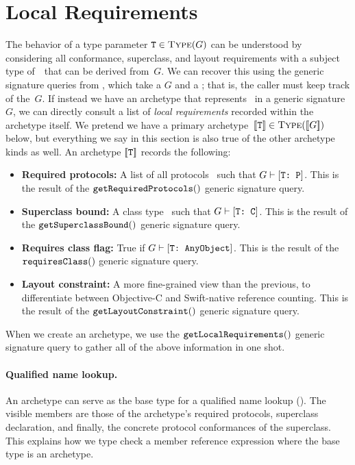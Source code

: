 \documentclass[../generics]{subfiles}
\begin{document}
\section{Local Requirements}\label{sec:local requirements}

The behavior of a type parameter $\texttt{T} \in \textsc{Type}({G})$ can be understood by considering all conformance, superclass, and layout requirements with a subject type of~\tT\ that can be derived from~$G$. We can recover this using the generic signature queries from , which take a $G$ and a \tT; that is, the caller must keep track of the~$G$. If instead we have an archetype that represents \tT\ in a generic signature~$G$, we can directly consult a list of \emph{local requirements} recorded within the archetype itself. We pretend we have a primary archetype~$[\![\texttt{T}]\!] \in \textsc{Type}({[\![G]\!]})$ below, but everything we say in this section is also true of the other archetype kinds as well. An archetype $[\![\texttt{T}]\!]$ records the following:
\begin{itemize}
\item \textbf{Required protocols:} A list of all protocols \tP\ such that $G\vdash[\texttt{T:~P}]$. This is the result of the $\texttt{getRequiredProtocols}()$ generic signature query.
\item \textbf{Superclass bound:} A class type \tC\ such that $G\vdash[\texttt{T:~C}]$. This is the result of the $\texttt{getSuperclassBound}()$ generic signature query.
\item \textbf{Requires class flag:} True if $G\vdash[\texttt{T:~AnyObject}]$. This is the result of the $\texttt{requiresClass}()$ generic signature query.
\item \textbf{Layout constraint:} A more fine-grained view than the previous, to differentiate between Objective-C and Swift-native reference counting. This is the result of the $\texttt{getLayoutConstraint}()$ generic signature query.
\end{itemize}
When we create an archetype, we use the $\texttt{getLocalRequirements}()$ generic signature query to gather all of the above information in one shot.

\paragraph{Qualified name lookup.} An archetype can serve as the base type for a qualified name lookup (). The visible members are those of the archetype's required protocols, superclass declaration, and finally, the concrete protocol conformances of the superclass. This explains how we type check a member reference expression where the base type is an archetype.
\end{document}
